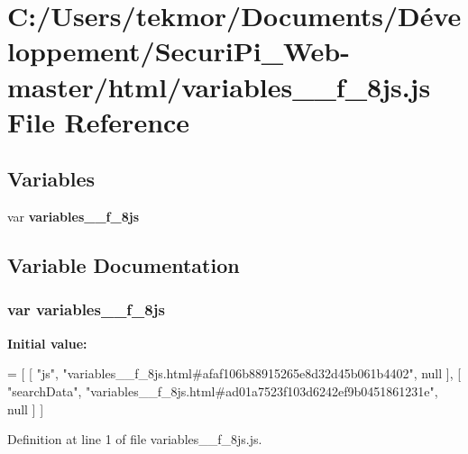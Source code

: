 \section{C\+:/\+Users/tekmor/\+Documents/\+Développement/\+Securi\+Pi\+\_\+\+Web-\/master/html/variables\+\_\+\+\_\+f\+\_\+8js.js File Reference}
\label{variables____f__8js_8js}
\subsection*{Variables}
\begin{DoxyCompactItemize}
\item 
var {\bf variables\+\_\+\+\_\+f\+\_\+8js}
\end{DoxyCompactItemize}


\subsection{Variable Documentation}
\subsubsection[{variables\+\_\+\+\_\+f\+\_\+8js}]{\setlength{\rightskip}{0pt plus 5cm}var variables\+\_\+\+\_\+f\+\_\+8js}\label{variables____f__8js_8js_a51a94e4585d773f4dee077b0241e520b}
{\bfseries Initial value\+:}
\begin{DoxyCode}
=
[
    [ \textcolor{stringliteral}{"js"}, \textcolor{stringliteral}{"variables\_\_f\_8js.html#afaf106b88915265e8d32d45b061b4402"}, null ],
    [ \textcolor{stringliteral}{"searchData"}, \textcolor{stringliteral}{"variables\_\_f\_8js.html#ad01a7523f103d6242ef9b0451861231e"}, null ]
]
\end{DoxyCode}


Definition at line 1 of file variables\+\_\+\+\_\+f\+\_\+8js.\+js.

